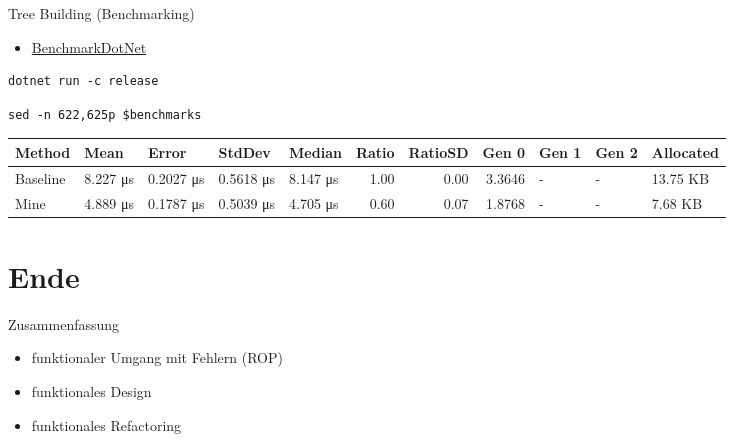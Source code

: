 \documentclass[t]{beamer}
\begin{document}
\begin{frame}[label={sec:orgc1c476f},fragile]{Tree Building (Benchmarking)}
 \begin{itemize}
\item \href{https://github.com/dotnet/BenchmarkDotNet}{BenchmarkDotNet}
\end{itemize}

\begin{verbatim}
dotnet run -c release
\end{verbatim}

\begin{verbatim}
sed -n 622,625p $benchmarks
\end{verbatim}

\tiny
\begin{center}
\begin{tabular}{lllllrrrlll}
Method & Mean & Error & StdDev & Median & Ratio & RatioSD & Gen 0 & Gen 1 & Gen 2 & Allocated\\[0pt]
\hline
Baseline & 8.227 μs & 0.2027 μs & 0.5618 μs & 8.147 μs & 1.00 & 0.00 & 3.3646 & - & - & 13.75 KB\\[0pt]
Mine & 4.889 μs & 0.1787 μs & 0.5039 μs & 4.705 μs & 0.60 & 0.07 & 1.8768 & - & - & 7.68 KB\\[0pt]
\end{tabular}
\end{center}
\end{frame}




\section{Ende }
\label{sec:org4434bc0}
\begin{frame}[label={sec:org8ba00d1}]{Zusammenfassung}
\begin{itemize}
\item funktionaler Umgang mit Fehlern (ROP)
\item funktionales Design
\item funktionales Refactoring
\end{itemize}
\end{frame}
\end{document}
